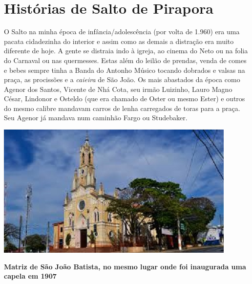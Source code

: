 \documentclass[12pt,brazil,]{book}
\begin{document}
\chapter{Histórias de Salto de
Pirapora}\label{histuxf3rias-de-salto-de-pirapora}

O Salto na minha época de infância/adolescência (por volta de 1.960) era
uma pacata cidadezinha do interior e assim como as demais a distração
era muito diferente de hoje. A gente se distraia indo à igreja, ao
cinema do Neto ou na folia do Carnaval ou nas quermesses. Estas além do
leilão de prendas, venda de comes e bebes sempre tinha a Banda do
Antonho Músico tocando dobrados e valsas na praça, as procissões e a
\emph{caieira} de São João. Os mais abastados da época como Agenor dos
Santos, Vicente de Nhá Cota, seu irmão Luizinho, Lauro Magno César,
Lindonor e Osteldo (que era chamado de Oster ou mesmo Ester) e outros do
mesmo calibre mandavam carros de lenha carregados de toras para a praça.
Seu Agenor já mandava num caminhão Fargo ou Studebaker.

\includegraphics{Imagens/Igreja.jpeg}

\textbf{Matriz de São João Batista, no mesmo lugar onde foi inaugurada
uma capela em 1907}
\end{document}
